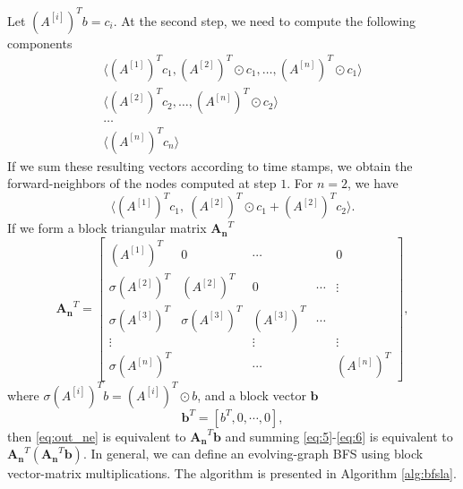 \documentclass[11pt,conference,compsocconf]{IEEEtran}
\theoremstyle{definition}
\begin{document}
Let $(A^{[i]})^Tb = c_i$.
At the second step, we need to compute the following components
\begin{align}
  \label{eq:5}
 \big\langle (A^{[1]})^Tc_1,   (A^{[2]})^T\odot c_1, \ldots,  (A^{[n]})^T\odot c_1  \big\rangle  \\
\big\langle (A^{[2]})^Tc_{2}, \ldots, (A^{[n]})^T\odot c_{2} \big\rangle \\
 \ldots  \\
  \big\langle (A^{[n]})^Tc_n \big\rangle
\label{eq:6}
\end{align}
If we sum these resulting vectors according to time stamps, we obtain
the forward-neighbors of the nodes computed at step $1$.
For $n =2$, we have
\[
\Big\langle
(A^{[1]})^Tc_1,~
(A^{[2]})^T\odot c_1 + (A^{[2]})^T c_2
\Big\rangle.
\]
If we form a block triangular matrix $\bm{A_n}^T$
\[
\bm{A_n}^T =
\begin{bmatrix}
(A^{[1]})^T &   0            & \cdots  &  & 0 \\
\sigma(A^{[2]})^T & (A^{[2]})^T & 0         &\cdots  & \vdots \\
\sigma(A^{[3]})^T & \sigma(A^{[3]})^T & (A^{[3]})^T & \cdots \\
   \vdots              &                              &      \vdots            &  &  \vdots \\
\sigma(A^{[n]})^T &                  &       \cdots                      &  & (A^{[n]})^T
\end{bmatrix},
\]
where  $\sigma(A^{[i]})^Tb = (A^{[i]})^T\odot b$, and a block vector $\bm{b}$
\[
\bm{b}^T = [b^T, 0, \cdots, 0  ],
\]
then \eqref{eq:out_ne} is equivalent to $\bm{A_n}^T\bm{b}$ and
summing \eqref{eq:5}-\eqref{eq:6} is equivalent to $\bm{A_n}^T(\bm{A_n}^T\bm{b})$.
In general, we can define an evolving-graph BFS using
block vector-matrix multiplications. The algorithm is presented in Algorithm
\ref{alg:bfsla}.
\end{document}
